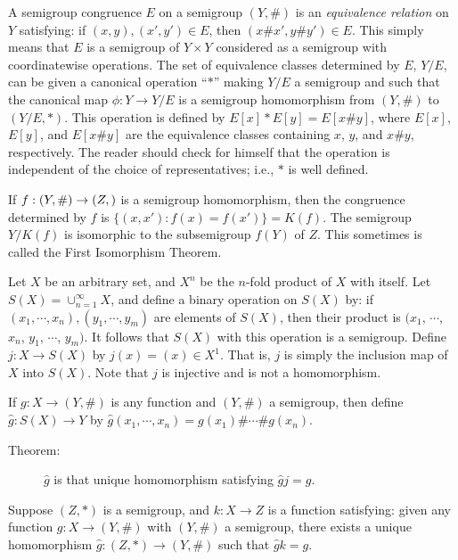 \documentclass{article}
\begin{document}
A semigroup congruence $E$ on a semigroup $(Y,\#)$ is an \emph{equivalence relation} on $Y$ satisfying: if $(x,y),(x',y') \in E$, then $(x\#x',y\#y') \in E$. This simply means that $E$ is a semigroup of $Y \times Y$ considered as a semigroup with coordinatewise operations. The set of equivalence classes determined by $E$, $Y/E$, can be given a canonical operation ``$*$'' making $Y/E$ a semigroup and such that the canonical map $\phi: Y \rightarrow Y/E$ is a semigroup homomorphism from $(Y,\#)$ to $(Y/E,*)$. This operation is defined by $E[x] * E[y] = E[x\#y]$, where $E[x]$, $E[y]$, and $E[x\#y]$ are the equivalence classes containing $x$, $y$, and $x\#y$, respectively. The reader should check for himself that the operation is independent of the choice of representatives; i.e., $*$ is well defined.

If $f: (Y,\#) \rightarrow (Z,\*)$ is a semigroup homomorphism, then the congruence determined by $f$ is $\{ (x,x') : f(x) = f(x') \} = K(f)$. The semigroup $Y/K(f)$ is isomorphic to the subsemigroup $f(Y)$ of $Z$. This sometimes is called the First Isomorphism Theorem.

Let $X$ be an arbitrary set, and $X^n$ be the $n$-fold product of $X$ with itself. Let $S(X) = \cup_{n=1}^\infty X$, and define a binary operation on $S(X)$ by: if $(x_1, \cdots, x_n), (y_1, \cdots, y_m)$ are elements of $S(X)$, then their product is $(x_1$, $\cdots$, $x_n$, $y_1$, $\cdots$, $y_m)$. It follows that $S(X)$ with this operation is a semigroup. Define $j: X \rightarrow S(X)$ by $j(x) = (x) \in X^1$. That is, $j$ is simply the inclusion map of $X$ into $S(X)$. Note that $j$ is injective and is not a homomorphism.

If $g: X \rightarrow (Y,\#)$ is any function and $(Y,\#)$ a semigroup, then define $\hat{g}: S(X) \rightarrow Y$ by $\hat{g}(x_1, \cdots, x_n) = g(x_1) \# \cdots \# g(x_n)$.

\begin{description}

\item[Theorem:] $\hat{g}$ is that unique homomorphism satisfying $\hat{g}j = g$.

\end{description}

Suppose $(Z,*)$ is a semigroup, and $k: X \rightarrow Z$ is a function satisfying: given any function $g: X \rightarrow (Y,\#)$ with $(Y,\#)$ a semigroup, there exists a unique homomorphism $\hat{g}: (Z,*) \rightarrow (Y,\#)$ such that $\hat{g}k = g$.
\end{document}
